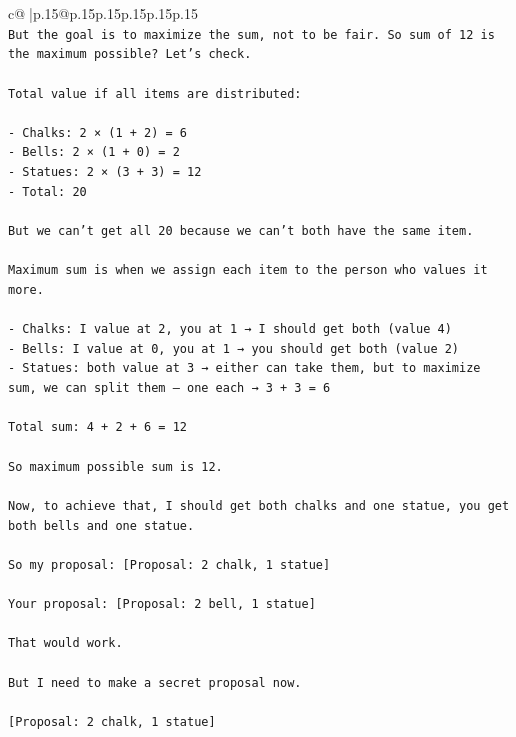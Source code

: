 \documentclass{article}
\begin{document}
{\begin{supertabular}{c@{$\;$}|p{.15\linewidth}@{}p{.15\linewidth}p{.15\linewidth}p{.15\linewidth}p{.15\linewidth}p{.15\linewidth}}
{{{\\ 
\texttt{But the goal is to maximize the sum, not to be fair. So sum of 12 is the maximum possible? Let's check.} \\
\\ 
\texttt{Total value if all items are distributed:} \\
\\ 
\texttt{{-} Chalks: 2 × (1 + 2) = 6} \\
\texttt{{-} Bells: 2 × (1 + 0) = 2} \\
\texttt{{-} Statues: 2 × (3 + 3) = 12} \\
\texttt{{-} Total: 20} \\
\\ 
\texttt{But we can't get all 20 because we can't both have the same item.} \\
\\ 
\texttt{Maximum sum is when we assign each item to the person who values it more.} \\
\\ 
\texttt{{-} Chalks: I value at 2, you at 1 → I should get both (value 4)} \\
\texttt{{-} Bells: I value at 0, you at 1 → you should get both (value 2)} \\
\texttt{{-} Statues: both value at 3 → either can take them, but to maximize sum, we can split them — one each → 3 + 3 = 6} \\
\\ 
\texttt{Total sum: 4 + 2 + 6 = 12} \\
\\ 
\texttt{So maximum possible sum is 12.} \\
\\ 
\texttt{Now, to achieve that, I should get both chalks and one statue, you get both bells and one statue.} \\
\\ 
\texttt{So my proposal: {[}Proposal: 2 chalk, 1 statue{]}} \\
\\ 
\texttt{Your proposal: {[}Proposal: 2 bell, 1 statue{]}} \\
\\ 
\texttt{That would work.} \\
\\ 
\texttt{But I need to make a secret proposal now.} \\
\\ 
\texttt{{[}Proposal: 2 chalk, 1 statue{]}} \\
            }
        }
    }
     \\ \\


\end{supertabular}}
\end{document}
